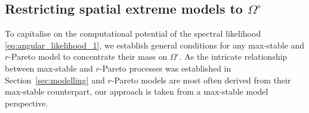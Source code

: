 \documentclass[12pt]{article}
\begin{document}
\subsection{Restricting spatial extreme models to $\Omega^\circ$}

To capitalise on the computational potential of the spectral likelihood \eqref{eq:angular_likelihood_1}, we establish general conditions for any max-stable and $r$-Pareto model to concentrate their mass on $\Omega^\circ$. As the intricate relationship between max-stable and $r$-Pareto processes was established in Section~\ref{sec:modelling} and $r$-Pareto models are most often derived from their max-stable counterpart, our approach is taken from a max-stable model perspective.
\end{document}
